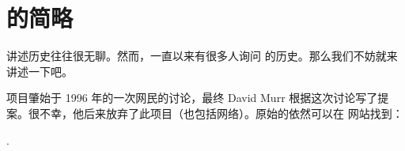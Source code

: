 \section{\FlightGear{} 的简略}
\fi
\iffalse
\IfLanguageName{english}{
\section{A Sketch on the \Index{History} of \FlightGear{}}
}{}
\IfLanguageName{french}{
\section{Une \'{e}bauche de l'\Index{histoire} de \FlightGear{}}
}{}
\fi
\ifchinese
讲述历史往往很无聊。然而，一直以来有很多人询问 \FlightGear{} 的历史。那么我们不妨就来讲述一下吧。

\FlightGear{} 项目肇始于 1996 年的一次网民的讨论，最终 David Murr 根据这次讨论写了提案。很不幸，他后来放弃了此项目（也包括网络）。原始的依然可以在 \FlightGear{} 网站找到：

\fi
\iffalse
\IfLanguageName{english}{
History may be a boring subject. However, from time to time there are people asking for the history of \FlightGear{}. As a result, we'll give a short outline.

The \FlightGear{} project goes back to a discussion among a group of net citizens in 1996 resulting in a proposal written by David Murr\index{Murr, David} who, unfortunately, dropped out of the project (as well as the net) later. The original \Index{proposal} is still available
from the \FlightGear{} web site and can be found under
}{}
\IfLanguageName{french}{
L'histoire peut rapidement devenir un sujet barbant. Cependant, de temps en temps il y a des personnes qui s'int\'{e}ressent \`{a} l'histoire de \FlightGear{}. En cons\'{e}quence, nous allons en dresser un aper\c{c}u rapide.

A l'origine, le projet \FlightGear{} remonte \`{a} une discussion entre un groupe de citoyens du net en 1996 qui a eu pour r\'{e}sultat l'\'{e}criture d'une proposition par David Murr\index{Murr, David} qui, malheureusement, a quitt\'{e} le projet (ainsi que le net) plus tard. La \Index{proposition} d'origine est toujours disponible
\`{a} partir du site Internet de \FlightGear{} \`{a} l'adresse :
}{}
\fi

 \medskip

.
 \medskip

